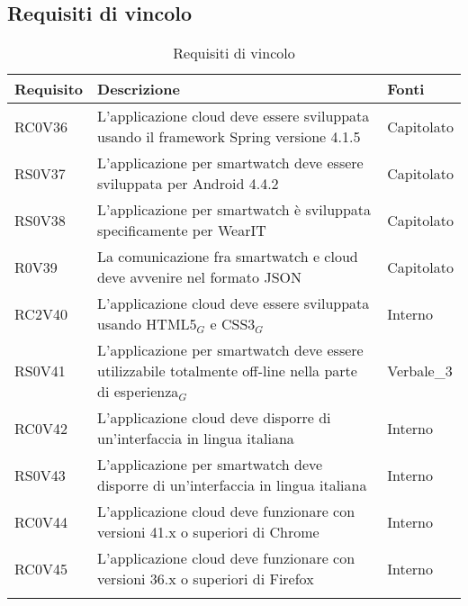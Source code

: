 \subsection{Requisiti di vincolo}
\begin{center}
\bgroup
\def\arraystretch{1.8}
\begin{longtable}{|l|p{7cm}|p{1.7cm}|} \hline
\textbf{Requisito} & \textbf{Descrizione} & \textbf{Fonti} \\\hline
RC0V36		& L'applicazione cloud deve essere sviluppata usando il framework Spring versione 4.1.5 & Capitolato \\\hline
RS0V37		& L'applicazione per smartwatch deve essere sviluppata per Android 4.4.2 & Capitolato \\\hline
RS0V38		& L'applicazione per smartwatch è sviluppata specificamente per WearIT & Capitolato \\\hline
R0V39		& La comunicazione fra smartwatch e cloud deve avvenire nel formato JSON & Capitolato \\\hline
RC2V40		& L'applicazione cloud deve essere sviluppata usando HTML5$_{G}$ e CSS3$_{G}$ & Interno \\\hline
RS0V41		& L'applicazione per smartwatch deve essere utilizzabile totalmente off-line nella parte di esperienza$_{G}$ & Verbale\_3 \\\hline
RC0V42		& L'applicazione cloud deve disporre di un'interfaccia in lingua italiana & Interno \\\hline
RS0V43		& L'applicazione per smartwatch deve disporre di un'interfaccia in lingua italiana & Interno \\\hline
RC0V44		& L'applicazione cloud deve funzionare con versioni 41.x o superiori di Chrome & Interno \\\hline
RC0V45		& L'applicazione cloud deve funzionare con versioni 36.x o superiori di Firefox & Interno \\\hline
\caption{Requisiti di vincolo}
\end{longtable}
\egroup
\end{center}

